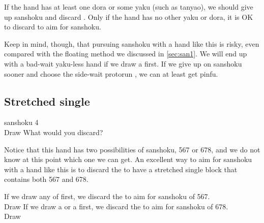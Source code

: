 \bigskip
If the hand has at least one {\jap dora} or some {\jap yaku} (such as {\jap tanyao}), we should give up {\jap sanshoku} and discard {\large{}}. Only if the hand has no other {\jap yaku} or {\jap dora}, it is OK to discard {\large{}} to aim for {\jap sanshoku}. 

\bigskip
Keep in mind, though, that pursuing {\jap sanshoku} with a hand like this is risky, even compared with the floating method we discussed in \ref{sec:san1}. We will end up with a bad-wait {\jap yaku}-less hand if we draw a {\large{}} first. If we give up on {\jap sanshoku} sooner and choose the side-wait protorun {\large{}}, we can at least get {\jap pinfu}. 

\newpage
\subsection{Stretched single}\label{sec:san4}
\begin{itembox}[r]{{\jap sanshoku} 4}
\bp
{}~\\
\hspace{290pt}\footnotesize{Draw}
\ep
\vspace{-17pt}What would you discard? \vspace{-5pt}
\end{itembox}
\noindent
Notice that this hand has two possibilities of {\jap sanshoku}, 567 or 678, and we do not know at this point which one we can get. An excellent way to aim for {\jap sanshoku} with a hand like this is to discard the {\large{}} to have a stretched single block {\large{}} that contains both 567 and 678. 

\bigskip
\noindent If we draw any of {\large{}} first, we discard the {\large{}} to aim for {\jap sanshoku} of 567. 
\bp
{}~\\
\hspace{290pt}\footnotesize{Draw}
\ep
If we draw a {\large{}} or a {\large{}} first, we discard the {\large{}} to aim for {\jap sanshoku} of 678. 
\bp
{}~\\
\hspace{290pt}\footnotesize{Draw}
\ep

